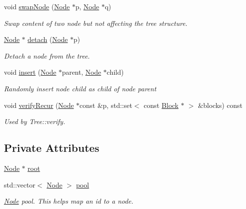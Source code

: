 \begin{DoxyCompactItemize}
void \hyperlink{classTTree_adbb05d027840467cdce8b9489bc49225}{swap\+Node} (\hyperlink{classTTree_1_1Node}{Node} $\ast$p, \hyperlink{classTTree_1_1Node}{Node} $\ast$q)
\begin{DoxyCompactList}\small\item\em Swap content of two node but not affecting the tree structure. \end{DoxyCompactList}\item 
\hyperlink{classTTree_1_1Node}{Node} $\ast$ \hyperlink{classTTree_ab9b74f48afd54c16fd1dc3b598019f7f}{detach} (\hyperlink{classTTree_1_1Node}{Node} $\ast$p)
\begin{DoxyCompactList}\small\item\em Detach a node from the tree. \end{DoxyCompactList}\item 
void \hyperlink{classTTree_a0bc18fd4039dc1ae0a53d2b68741a92b}{insert} (\hyperlink{classTTree_1_1Node}{Node} $\ast$parent, \hyperlink{classTTree_1_1Node}{Node} $\ast$child)
\begin{DoxyCompactList}\small\item\em Randomly insert node {\ttfamily child} as child of node {\ttfamily parent} \end{DoxyCompactList}\item 
void \hyperlink{classTTree_ab50938f36651a0cb2077ae84de2576a7}{verify\+Recur} (\hyperlink{classTTree_1_1Node}{Node} $\ast$const \&p, std\+::set$<$ const \hyperlink{structBlock}{Block} $\ast$ $>$ \&blocks) const 
\begin{DoxyCompactList}\small\item\em Used by Tree\+::verify. \end{DoxyCompactList}\end{DoxyCompactItemize}
\subsection*{Private Attributes}
\begin{DoxyCompactItemize}
\item 
\hyperlink{classTTree_1_1Node}{Node} $\ast$ \hyperlink{classTTree_a76972bd24a6d2f940fe1645d008a4a04}{root}
\item 
std\+::vector$<$ \hyperlink{classTTree_1_1Node}{Node} $>$ \hyperlink{classTTree_a58f7a793347834e9caee3d87c7202966}{pool}
\begin{DoxyCompactList}\small\item\em \hyperlink{classTTree_1_1Node}{Node} pool. This helps map an id to a node. \end{DoxyCompactList}\end{DoxyCompactItemize}


